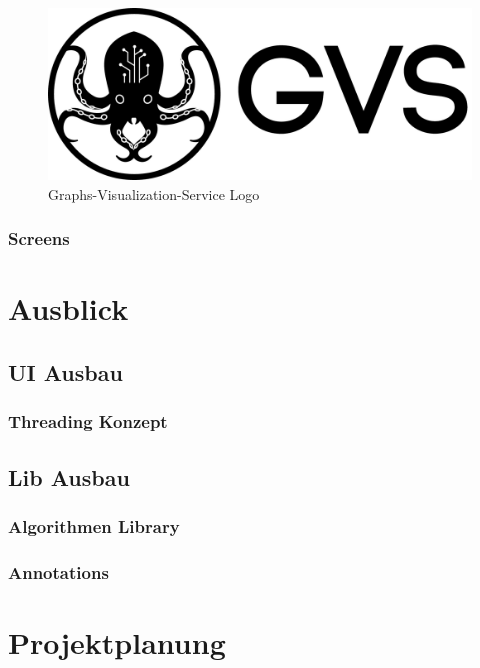 \documentclass[11pt,a4paper,english,oneside]{book}
\numberwithin{equation}{chapter}
\begin{document}
	\begin{figure}[h!]
		\centering
		\includegraphics[width=0.5\linewidth]{assets/images/logo}
		\caption[GVS Logo]{Graphs-Visualization-Service Logo}
		\label{fig:logo}
	\end{figure}
	
	\subsection{Screens}
	
	\chapter{Ausblick}
	
	\section{UI Ausbau}
	
	\subsection{Threading Konzept}
	
	\section{Lib Ausbau}
	
	\subsection{Algorithmen Library}
	
	\subsection{Annotations}
	
	
	
	\chapter{Projektplanung}
	
\end{document}
